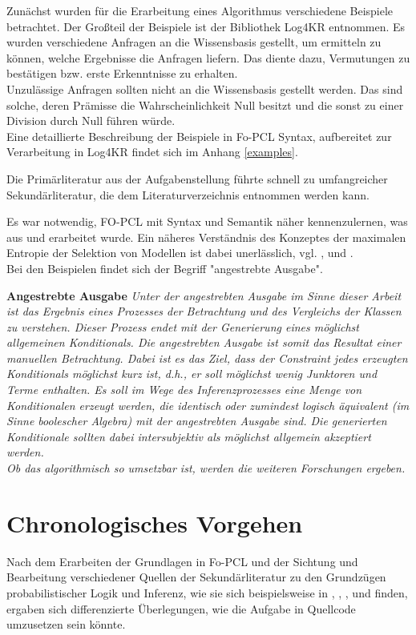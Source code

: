 \documentclass[draft]{scrreprt}
\begin{document}
Zunächst wurden für die Erarbeitung eines Algorithmus verschiedene Beispiele betrachtet. Der Großteil der Beispiele ist der Bibliothek Log4KR entnommen. Es wurden verschiedene Anfragen an die Wissensbasis gestellt, um ermitteln zu können, welche Ergebnisse die Anfragen liefern. Das diente dazu, Vermutungen zu bestätigen bzw. erste Erkenntnisse zu erhalten.\\
Unzulässige Anfragen sollten nicht an die Wissensbasis gestellt werden. Das sind solche, deren Prämisse die Wahrscheinlichkeit Null besitzt und die sonst zu einer Division durch Null führen würde.\\
Eine detaillierte Beschreibung der Beispiele in Fo-PCL Syntax, aufbereitet zur Verarbeitung in Log4KR findet sich im Anhang \ref{examples}.

Die Primärliteratur aus der Aufgabenstellung \cite{Fis10} führte schnell zu umfangreicher Sekundärliteratur, die dem Literaturverzeichnis entnommen werden kann.

Es war notwendig, FO-PCL mit Syntax und Semantik näher kennenzulernen, was aus \cite{Fis10} und \cite{Fis12} erarbeitet wurde. Ein näheres Verständnis des Konzeptes der maximalen Entropie der Selektion von Modellen ist dabei unerlässlich, vgl. \cite{RKI97}, \cite{BKI08} und \cite{TFLKIB10}.
\\


Bei den Beispielen findet sich der Begriff "{}angestrebte Ausgabe"{}.

\noindent
\textbf{Angestrebte Ausgabe}
\label{angestrebte Ausgabe}
\emph{Unter der angestrebten Ausgabe im Sinne dieser Arbeit ist das Ergebnis eines Prozesses der Betrachtung und des Vergleichs der Klassen zu verstehen. Dieser Prozess endet mit der Generierung eines möglichst allgemeinen Konditionals. Die angestrebten Ausgabe ist somit das Resultat einer manuellen Betrachtung. Dabei ist es das Ziel, dass der Constraint jedes erzeugten Konditionals möglichst kurz ist, d.h., er soll möglichst wenig Junktoren und Terme enthalten. Es soll im Wege des Inferenzprozesses eine Menge von Konditionalen erzeugt werden, die identisch oder zumindest logisch äquivalent (im Sinne boolescher Algebra) mit der angestrebten Ausgabe sind.  Die generierten Konditionale sollten dabei intersubjektiv als möglichst allgemein akzeptiert werden.\\
Ob das algorithmisch so umsetzbar ist, werden die weiteren Forschungen ergeben.}


\section{Chronologisches Vorgehen}
Nach dem Erarbeiten der Grundlagen in Fo-PCL und der Sichtung und Bearbeitung verschiedener Quellen der Sekundärliteratur zu den Grundzügen probabilistischer Logik und Inferenz, wie sie sich beispielsweise in \cite{Fis09}, \cite{Fis10},  \cite{FLT09}, \cite{KIBFT11} und \cite{RKI97} finden, ergaben sich differenzierte Überlegungen, wie die Aufgabe in Quellcode umzusetzen sein könnte.
\end{document}
